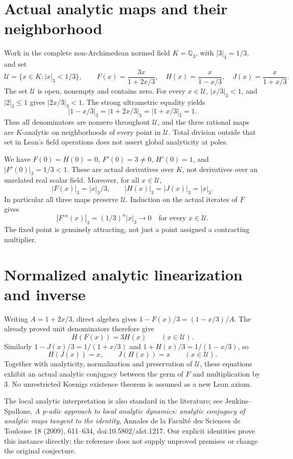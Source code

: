 \documentclass[10pt,a4paper]{article}
\newcommand{\Q}{\mathbb Q}
\newcommand{\U}{\mathcal U}
\begin{document}
\section{Actual analytic maps and their neighborhood}
Work in the complete non-Archimedean normed field $K=\Q_3$, with $|3|_3=1/3$, and set
\[
 \U=\{x\in K:|x|_3<1/3\},\qquad
 F(x)=\frac{3x}{1+2x/3},\quad
 H(x)=\frac{x}{1-x/3},\quad
 J(x)=\frac{x}{1+x/3}.
\]
The set $\U$ is open, nonempty and contains zero. For every $x\in\U$,
$|x/3|_3<1$, and $|2|_3\le1$ gives $|2x/3|_3<1$.
The strong ultrametric equality yields
\[
 |1-x/3|_3=|1+2x/3|_3=|1+x/3|_3=1.
\]
Thus all denominators are nonzero throughout $\U$, and the three rational maps are
$K$-analytic on neighborhoods of every point in $\U$. Total division outside that set in
Lean's field operations does not assert global analyticity at poles.

We have $F(0)=H(0)=0$, $F'(0)=3\ne0$, $H'(0)=1$, and $|F'(0)|_3=1/3<1$.
These are actual derivatives over $K$, not derivatives over an unrelated real scalar field.
Moreover, for all $x\in\U$,
\begin{equation}\label{eq:norms}
 |F(x)|_3=|x|_3/3,\qquad |H(x)|_3=|J(x)|_3=|x|_3.
\end{equation}
In particular all three maps preserve $\U$.
Induction on the actual iterates of $F$ gives
\[
 |F^{\circ n}(x)|_3=(1/3)^n|x|_3 \longrightarrow0
 \quad\text{for every }x\in\U.
\]
The fixed point is genuinely attracting, not just a point assigned a contracting multiplier.

\section{Normalized analytic linearization and inverse}
Writing $A=1+2x/3$, direct algebra gives
$1-F(x)/3=(1-x/3)/A$. The already proved unit denominators therefore give
\begin{equation}\label{eq:schroder}
 H(F(x))=3H(x)\qquad(x\in\U).
\end{equation}
Similarly $1-J(x)/3=1/(1+x/3)$ and $1+H(x)/3=1/(1-x/3)$, so
\[
 H(J(x))=x,\qquad J(H(x))=x\qquad(x\in\U).
\]
Together with analyticity, normalization and preservation of $\U$, these equations exhibit
an actual analytic conjugacy between the germ of $F$ and multiplication by $3$.
No unrestricted Koenigs existence theorem is assumed as a new Lean axiom.

The local analytic interpretation is also standard in the literature; see Jenkins--Spallone,
\emph{A p-adic approach to local analytic dynamics: analytic conjugacy of analytic maps tangent to the identity},
Annales de la Facult\'e des Sciences de Toulouse 18 (2009), 611--634,
doi:10.5802/afst.1217. Our explicit identities prove this instance directly;
the reference does not supply unproved premises or change the original conjecture.
\end{document}
